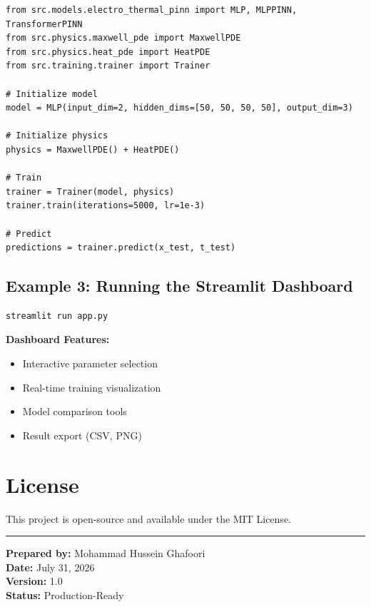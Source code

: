 \documentclass[11pt,a4paper]{article}
\begin{document}
\begin{lstlisting}
from src.models.electro_thermal_pinn import MLP, MLPPINN, TransformerPINN
from src.physics.maxwell_pde import MaxwellPDE
from src.physics.heat_pde import HeatPDE
from src.training.trainer import Trainer

# Initialize model
model = MLP(input_dim=2, hidden_dims=[50, 50, 50, 50], output_dim=3)

# Initialize physics
physics = MaxwellPDE() + HeatPDE()

# Train
trainer = Trainer(model, physics)
trainer.train(iterations=5000, lr=1e-3)

# Predict
predictions = trainer.predict(x_test, t_test)
\end{lstlisting}

\subsection{Example 3: Running the Streamlit Dashboard}

\begin{lstlisting}
streamlit run app.py
\end{lstlisting}

\textbf{Dashboard Features:}
\begin{itemize}
    \item Interactive parameter selection
    \item Real-time training visualization
    \item Model comparison tools
    \item Result export (CSV, PNG)
\end{itemize}

\section{License}

This project is open-source and available under the MIT License.

\vspace{2cm}
\begin{center}
\textcolor{brandblue}{\rule{0.5\textwidth}{1pt}}

\vspace{0.5cm}

{\small\textbf{Prepared by:} Mohammad Hussein Ghafoori}\\
{\small\textbf{Date:} July 31, 2026}\\
{\small\textbf{Version:} 1.0}\\
{\small\textbf{Status:} Production-Ready}
\end{center}
\end{document}
